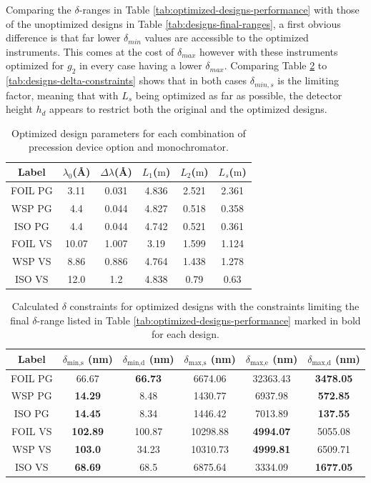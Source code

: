\documentclass{article}
\begin{document}
Comparing the $\delta$-ranges in Table \ref{tab:optimized-designs-performance} with those of the unoptimized designs in Table \ref{tab:designs-final-ranges}, a first obvious difference is that far lower $\delta_{min}$ values are accessible to the optimized instruments. This comes at the cost of $\delta_{max}$ however with these instruments optimized for $g_2$ in every case having a lower $\delta_{max}$. Comparing Table \ref{tab:optimized-designs-delta-constraints} to \ref{tab:designs-delta-constraints} shows that in both cases $\delta_{min,s}$ is the limiting factor, meaning that with $L_s$ being optimized as far as possible, the detector height $h_d$ appears to restrict both the original and the optimized designs.

\begin{table}[h!]
	\centering
	\begin{tabular}{c | c c c c c}
		\toprule
		Label & $\lambda_0$(Å) & $\Delta\lambda$(Å) & $L_1$($\unit{\meter}$) & $L_2$($\unit{\meter}$) & $L_s$($\unit{\meter}$) \\
		\midrule
		FOIL PG & 3.11 & 0.031 & 4.836 & 2.521 & 2.361 \\
		WSP PG & 4.4 & 0.044 & 4.827 & 0.518 & 0.358 \\
		ISO PG & 4.4 & 0.044 & 4.742 & 0.521 & 0.361 \\
		FOIL VS & 10.07 & 1.007 & 3.19 & 1.599 & 1.124 \\
		WSP VS & 8.86 & 0.886 & 4.764 & 1.438 & 1.278 \\
		ISO VS & 12.0 & 1.2 & 4.838 & 0.79 & 0.63 \\
		\bottomrule
	\end{tabular}
	\caption{Optimized design parameters for each combination of precession device option and monochromator. }
	\label{tab:optimized-designs}
\end{table}
\begin{table}[h!]
	\centering
	\begin{tabular}{c|cc|ccc}
		\toprule
		Label & $\delta_{\text{min,s}}$ (nm) & $\delta_{\text{min,d}}$ (nm) & $\delta_{\text{max,s}}$ (nm) & $\delta_{\text{max,e}}$ (nm) & $\delta_{\text{max,d}}$ (nm) \\
		\midrule
		FOIL PG & 66.67 & \textbf{66.73} & 6674.06 & 32363.43 & \textbf{3478.05} \\
		WSP PG & \textbf{14.29} & 8.48 & 1430.77 & 6937.98 & \textbf{572.85} \\
		ISO PG & \textbf{14.45} & 8.34 & 1446.42 & 7013.89 & \textbf{137.55} \\
		FOIL VS & \textbf{102.89} & 100.87 & 10298.88 & \textbf{4994.07} & 5055.08 \\
		WSP VS & \textbf{103.0} & 34.23 & 10310.73 & \textbf{4999.81} & 6509.71 \\
		ISO VS & \textbf{68.69} & 68.5 & 6875.64 & 3334.09 & \textbf{1677.05} \\
		\bottomrule
	\end{tabular}
	\caption{Calculated $\delta$ constraints for optimized designs with the constraints limiting the final $\delta$-range listed in Table \ref{tab:optimized-designs-performance} marked in bold for each design.}
	\label{tab:optimized-designs-delta-constraints}
\end{table}
\end{document}
